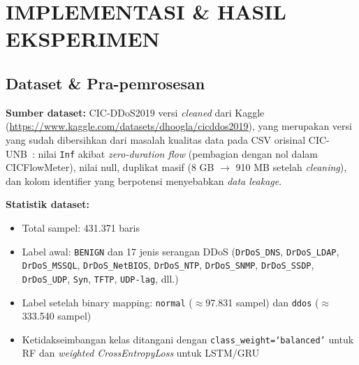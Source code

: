 \documentclass[11pt,a4paper,oneside]{report}
\begin{document}
\chapter{IMPLEMENTASI \& HASIL EKSPERIMEN}
\label{bab:implementasi}

\section{Dataset \& Pra-pemrosesan}

\textbf{Sumber dataset:} CIC-DDoS2019 versi \textit{cleaned} dari Kaggle (\url{https://www.kaggle.com/datasets/dhoogla/cicddos2019}), yang merupakan versi yang sudah dibersihkan dari masalah kualitas data pada CSV orisinal CIC-UNB~\cite{sharafaldin2019}: nilai \texttt{Inf} akibat \textit{zero-duration flow} (pembagian dengan nol dalam CICFlowMeter), nilai null, duplikat masif (8 GB $\to$ 910 MB setelah \textit{cleaning}), dan kolom identifier yang berpotensi menyebabkan \textit{data leakage}.

\textbf{Statistik dataset:}
\begin{itemize}[leftmargin=*]
    \item Total sampel: 431.371 baris
    \item Label awal: \texttt{BENIGN} dan 17 jenis serangan DDoS (\texttt{DrDoS\_DNS}, \texttt{DrDoS\_LDAP}, \texttt{DrDoS\_MSSQL}, \texttt{DrDoS\_NetBIOS}, \texttt{DrDoS\_NTP}, \texttt{DrDoS\_SNMP}, \texttt{DrDoS\_SSDP}, \texttt{DrDoS\_UDP}, \texttt{Syn}, \texttt{TFTP}, \texttt{UDP-lag}, dll.)
    \item Label setelah binary mapping: \texttt{normal} ($\approx$97.831 sampel) dan \texttt{ddos} ($\approx$333.540 sampel)
    \item Ketidakseimbangan kelas ditangani dengan \texttt{class\_weight=`balanced'} untuk RF dan \textit{weighted CrossEntropyLoss} untuk LSTM/GRU
\end{itemize}
\end{document}
